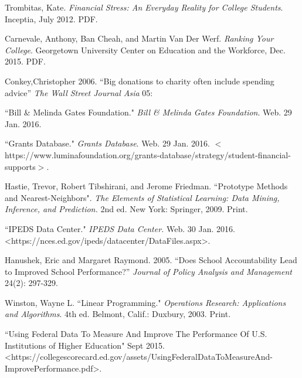 \documentclass[12pt]{scrartcl}
\begin{document}
\begin{thebibliography}{10}
	 Trombitas, Kate.  \emph{Financial Stress: An Everyday Reality for College Students}. Inceptia, July 2012. PDF. 

	 Carnevale, Anthony, Ban Cheah, and Martin Van Der Werf. \emph{Ranking Your College}. Georgetown University Center on Education and the Workforce, Dec. 2015. PDF.
	
	 Conkey,Christopher 2006. ``Big donations to charity often include spending advice” \emph{The Wall Street Journal Asia} 05:
	
	 ``Bill \& Melinda Gates Foundation." \emph{Bill \& Melinda Gates Foundation}. Web. 29 Jan. 2016. 
	
	 ``Grants Database." \emph{Grants Database}. Web. 29 Jan. 2016. $<$https://www.luminafoundation.org/grants-database/strategy/student-financial-supports$>$. 
	
	 Hastie, Trevor, Robert Tibshirani, and Jerome Friedman. ``Prototype Methods and Nearest-Neighbors". \emph{The Elements of Statistical Learning: Data Mining, Inference, and Prediction.} 2nd ed. New York: Springer, 2009. Print. 

	 ``IPEDS Data Center." \emph{IPEDS Data Center.} Web. 30 Jan. 2016. \textless https://nces.ed.gov/ipeds/datacenter/DataFiles.aspx\textgreater.

	 Hanushek, Eric and Margaret Raymond. 2005. ``Does School Accountability Lead to Improved School Performance?” \emph{Journal of Policy Analysis and Management} 24(2): 297-329.
	
	 Winston, Wayne L. ``Linear Programming."  \emph{Operations Research: Applications and Algorithms}. 4th ed. Belmont, Calif.: Duxbury, 2003. Print.
	
	 ``Using Federal Data To Measure And Improve The Performance Of U.S. Institutions of Higher Education" Sept 2015. \textless https://collegescorecard.ed.gov/assets/UsingFederalDataToMeasureAnd- \\ImprovePerformance.pdf\textgreater.
\end{thebibliography}
\end{document}
